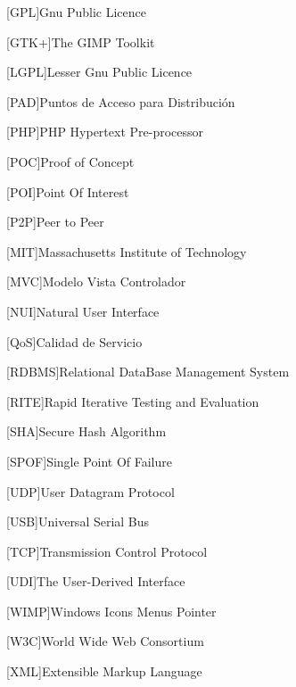 {\begin{acronym}[XXXXXXXX]
		[GPL]{Gnu Public Licence}
		
		{The GIMP Toolkit}
		
		{Lesser Gnu Public Licence}
		
		[PAD]{Puntos de Acceso para Distribución}

        [PHP]{PHP Hypertext Pre-processor}

        [POC]{Proof of Concept}
        
		[POI]{Point Of Interest}
		
		[P2P]{Peer to Peer}
		
		[MIT]{Massachusetts Institute of Technology}
		
		[MVC]{Modelo Vista Controlador}
		
		[NUI]{Natural User Interface}
		
		[QoS]{Calidad de Servicio}
		
		[RDBMS]{Relational DataBase Management System}
		
		{Rapid Iterative Testing and Evaluation}
		
		[SHA]{Secure Hash Algorithm}

		{Single Point Of Failure}
		
		[UDP]{User Datagram Protocol}
		
		[USB]{Universal Serial Bus}
		
		[TCP]{Transmission Control Protocol}
		
		[UDI]{The User-Derived Interface}

        [WIMP]{Windows Icons Menus Pointer}

        [W3C]{World Wide Web Consortium}
        
        [XML]{Extensible Markup Language}
		
		
	\end{acronym}
}

